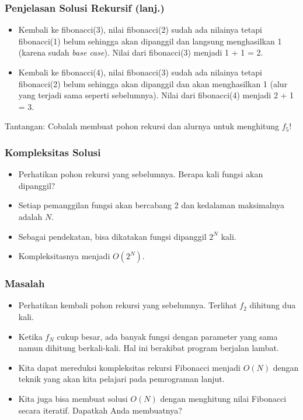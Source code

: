 \begin{frame}
\frametitle{Penjelasan Solusi Rekursif (lanj.)}
\begin {itemize}
  \item Kembali ke fibonacci(3), nilai fibonacci(2) sudah ada nilainya tetapi fibonacci(1) belum sehingga akan dipanggil dan langsung menghasilkan 1 (karena sudah \textit{base case}). Nilai dari fibonacci(3) menjadi 1 + 1 = 2.
  \item Kembali ke fibonacci(4), nilai fibonacci(3) sudah ada nilainya tetapi fibonacci(2) belum sehingga akan dipanggil dan akan menghasilkan 1 (alur yang terjadi sama seperti sebelumnya). Nilai dari fibonacci(4) menjadi 2 + 1 = 3.
\end{itemize}
Tantangan: Cobalah membuat pohon rekursi dan alurnya untuk menghitung $f_5$!
\end{frame}

\begin{frame}
\frametitle{Kompleksitas Solusi}
\begin {itemize}
   \item Perhatikan pohon rekursi yang sebelumnya. Berapa kali fungsi akan dipanggil?
   \item Setiap pemanggilan fungsi akan bercabang 2 dan kedalaman maksimalnya adalah $N$.
   \item Sebagai pendekatan, bisa dikatakan fungsi dipanggil $2^N$ kali.
   \item Kompleksitasnya menjadi $O(2^{N})$.
\end {itemize}
\end{frame}

\begin{frame}
\frametitle{Masalah}
\begin{itemize}
  \item Perhatikan kembali pohon rekursi yang sebelumnya. Terlihat $f_2$ dihitung dua kali.
  \item Ketika $f_N$ cukup besar, ada banyak fungsi dengan parameter yang sama namun dihitung berkali-kali. Hal ini berakibat program berjalan lambat.
  \item Kita dapat mereduksi kompleksitas rekursi Fibonacci menjadi $O(N)$ dengan teknik yang akan kita pelajari pada pemrograman lanjut.
  \item Kita juga bisa membuat solusi $O(N)$ dengan menghitung nilai Fibonacci secara iteratif. Dapatkah Anda membuatnya?
\end{itemize}
\end{frame}


